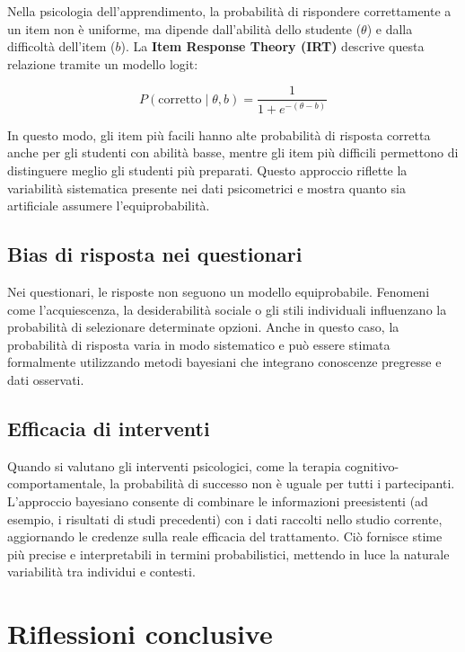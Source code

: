 \documentclass[
  letterpaper,
  DIV=11,
  numbers=noendperiod,
  oneside]{scrreprt}
\theoremstyle{definition}
\theoremstyle{plain}
\theoremstyle{definition}
\theoremstyle{remark}
\begin{document}
Nella psicologia dell'apprendimento, la probabilità di rispondere
correttamente a un item non è uniforme, ma dipende dall'abilità dello
studente (\(\theta\)) e dalla difficoltà dell'item (\(b\)). La
\textbf{Item Response Theory (IRT)} descrive questa relazione tramite un
modello logit:

\[
P(\text{corretto} \mid \theta, b) = \frac{1}{1 + e^{-(\theta - b)}}
\]

In questo modo, gli item più facili hanno alte probabilità di risposta
corretta anche per gli studenti con abilità basse, mentre gli item più
difficili permettono di distinguere meglio gli studenti più preparati.
Questo approccio riflette la variabilità sistematica presente nei dati
psicometrici e mostra quanto sia artificiale assumere l'equiprobabilità.

\subsection{Bias di risposta nei
questionari}\label{bias-di-risposta-nei-questionari}

Nei questionari, le risposte non seguono un modello equiprobabile.
Fenomeni come l'acquiescenza, la desiderabilità sociale o gli stili
individuali influenzano la probabilità di selezionare determinate
opzioni. Anche in questo caso, la probabilità di risposta varia in modo
sistematico e può essere stimata formalmente utilizzando metodi
bayesiani che integrano conoscenze pregresse e dati osservati.

\subsection{Efficacia di interventi}\label{efficacia-di-interventi}

Quando si valutano gli interventi psicologici, come la terapia
cognitivo-comportamentale, la probabilità di successo non è uguale per
tutti i partecipanti. L'approccio bayesiano consente di combinare le
informazioni preesistenti (ad esempio, i risultati di studi precedenti)
con i dati raccolti nello studio corrente, aggiornando le credenze sulla
reale efficacia del trattamento. Ciò fornisce stime più precise e
interpretabili in termini probabilistici, mettendo in luce la naturale
variabilità tra individui e contesti.

\section*{Riflessioni conclusive}\label{riflessioni-conclusive-2}
\end{document}
